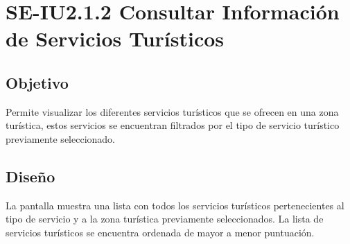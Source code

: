 \newpage
\section{SE-IU2.1.2 Consultar Información de Servicios Turísticos}

\subsection{Objetivo}
Permite visualizar los diferentes servicios turísticos que se ofrecen en una zona turística, estos servicios se encuentran filtrados por el tipo de servicio turístico previamente seleccionado.

\subsection{Diseño}
La pantalla  muestra una lista con todos los servicios turísticos pertenecientes al tipo de servicio y a la zona turística previamente seleccionados. La lista de servicios turísticos se encuentra ordenada de mayor a menor puntuación.


